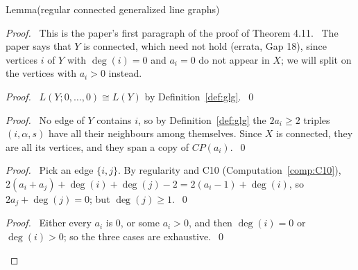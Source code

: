 \begin{namedresult}{Lemma}{(regular connected generalized line graphs)}\label{lem:4-regglg}
\end{namedresult}
\begin{proof}
 \pfsketch\ This is the paper's first paragraph of the proof of Theorem 4.11. \repair\ The paper
 says that $Y$ is connected, which need not hold (errata, Gap 18), since vertices $i$ of $Y$
 with $\deg(i)=0$ and $a_i=0$ do not appear in $X$; we will split on the vertices with $a_i>0$
 instead.
 \begin{proof}\pf\ $L(Y;0,\dots,0)\cong L(Y)$ by Definition~\ref{def:glg}.~\qed\end{proof}
 \begin{proof}\pf\ No edge of $Y$ contains $i$, so by Definition~\ref{def:glg} the $2a_i\ge2$
  triples $(i,\alpha,s)$ have all their neighbours among themselves. Since $X$ is connected,
  they are all its vertices, and they span a copy of $CP(a_i)$.~\qed\end{proof}
 \begin{proof}\pf\ Pick an edge $\{i,j\}$. By regularity and C10 (Computation~\ref{comp:C10}),
  $2(a_i+a_j)+\deg(i)+\deg(j)-2=2(a_i-1)+\deg(i)$, so $2a_j+\deg(j)=0$; but $\deg(j)\ge1$.~\qed\end{proof}
 \qedstep
 \begin{proof}\pf\ Either every $a_i$ is 0, or some $a_i>0$, and then $\deg(i)=0$ or $\deg(i)>0$; so the
  three cases are exhaustive.~\qed\end{proof}
\end{proof}


